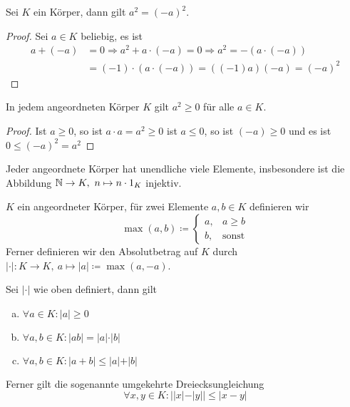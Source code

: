     \begin{lemma}
        Sei $K$ ein Körper, dann gilt $a^2=(-a)^2$.  
    \end{lemma}
    \begin{proof}Sei $a\in K$ beliebig, es ist
    \begin{align*}
        a+(-a) &= 0 \Rightarrow a^2 + a\cdot (-a) = 0 \Rightarrow a^2 = -(a\cdot(-a)) \\ &= (-1)\cdot (a\cdot (-a)) = ((-1)a)(-a)=(-a)^2
    \end{align*}
    \end{proof}
    \begin{lemma}
        In jedem angeordneten Körper $K$ gilt $a^2\ge 0$ für alle $a\in K$.
    \end{lemma}
    \begin{proof}
        Ist $a\ge 0$, so ist $a\cdot a = a^2\ge 0$ ist $a\le0$, so ist $(-a)\ge 0$ und es ist $0\le (-a)^2 = a^2$
    \end{proof}
    \begin{lemma}
        Jeder angeordnete Körper hat unendliche viele Elemente, insbesondere ist die Abbildung $\mathbb{N}\to K, \ n\mapsto n\cdot 1_K$ injektiv.
    \end{lemma}
    \begin{defn}
        $K$ ein angeordneter Körper, für zwei Elemente $a,b\in K$ definieren wir 
        \[
        \max(a,b) \coloneqq \begin{cases}
            a, & a\ge b\\
            b, & \text{sonst}
        \end{cases}    
        \] 
        Ferner definieren wir den Absolutbetrag auf $K$ durch $\vert \cdot \vert:K\to K, \ a\mapsto \vert a\vert \coloneqq \max(a,-a)$.
    \end{defn}
    \begin{lemma}
        Sei $\vert\cdot\vert$ wie oben definiert, dann gilt
        \begin{enumerate}[(a)]
            \item $\forall a\in K: \vert a\vert \ge 0$
            \item $\forall a,b\in K: \vert ab\vert = \vert a\vert \cdot\vert b \vert $
            \item $\forall a,b\in K: \vert a+b\vert \le \vert a \vert + \vert b\vert$
        \end{enumerate}
        Ferner gilt die sogenannte umgekehrte Dreiecksungleichung 
        \[
        \forall x,y\in K : \vert \vert x\vert - \vert y\vert \vert \le \vert x-y\vert     
        \]
    \end{lemma}
